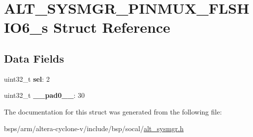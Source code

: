 \hypertarget{structALT__SYSMGR__PINMUX__FLSHIO6__s}{}\section{A\+L\+T\+\_\+\+S\+Y\+S\+M\+G\+R\+\_\+\+P\+I\+N\+M\+U\+X\+\_\+\+F\+L\+S\+H\+I\+O6\+\_\+s Struct Reference}
\label{structALT__SYSMGR__PINMUX__FLSHIO6__s}
\subsection*{Data Fields}
\begin{DoxyCompactItemize}
\item 
\mbox{\label{structALT__SYSMGR__PINMUX__FLSHIO6__s_a8ea40d1a887c58ed7ae8327a3ae9797f}} 
uint32\+\_\+t {\bfseries sel}\+: 2
\item 
\mbox{\label{structALT__SYSMGR__PINMUX__FLSHIO6__s_a7155330da4457bb559aae42a021d6d52}} 
uint32\+\_\+t {\bfseries \+\_\+\+\_\+pad0\+\_\+\+\_\+}\+: 30
\end{DoxyCompactItemize}


The documentation for this struct was generated from the following file\+:\begin{DoxyCompactItemize}
\item 
bsps/arm/altera-\/cyclone-\/v/include/bsp/socal/\mbox{\hyperlink{alt__sysmgr_8h}{alt\+\_\+sysmgr.\+h}}\end{DoxyCompactItemize}
